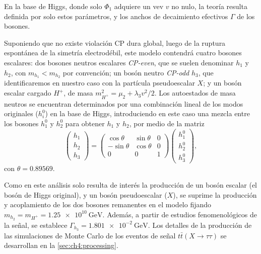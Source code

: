 En la base de Higgs, donde solo $\Phi_1$ adquiere un vev $v$ no nulo, la teoría resulta definida por solo estos parámetros, y los anchos de decaimiento efectivos $\Gamma$ de los bosones.

Suponiendo que no existe violación CP dura global, luego de la ruptura espontánea de la simetría electrodébil, este modelo contendrá cuatro bosones escalares: dos bosones neutros escalares \textit{CP-even}, que se suelen denominar $h_1$ y $h_2$, con $m_{h_1} < m_{h_2}$ por convención; un bosón neutro \textit{CP-odd} $h_3$, que identificaremos en nuestro caso con la partícula pseudoescalar $X$; y un bosón escalar cargado $H^+$, de masa $m_{H^+}^2 = \mu_2 + \lambda_3 v^2/2$. Los autoestados de masa neutros se encuentran determinados por una combinación lineal de los modos originales ($h_i^0$) en la base de Higgs, introduciendo en este caso una mezcla entre los bosones $h_1^0$ y $h_2^0$ para obtener $h_1$ y $h_2$, por medio de la matriz
\[
    \begin{pmatrix} h_1 \\ h_2 \\ h_3 \end{pmatrix}
    =
    \begin{pmatrix} \cos\theta & \sin\theta & 0 \\ -\sin\theta & \cos\theta & 0 \\ 0 & 0 & 1 \end{pmatrix}
    \begin{pmatrix} h^0_1 \\ h^0_2 \\ h^0_3 \end{pmatrix},
\]
con $\theta = 0.89569$.

Como en este análisis solo resulta de interés la producción de un bosón escalar (el bosón de Higgs original), y un bosón pseudoescalar ($X$), se suprime la producción y acoplamiento de los dos bosones remanentes en el modelo fijando $m_{h_2} = m_{H^+} = \SI{1.25e10}{\GeV}$. Además, a partir de estudios fenomenológicos de la señal, se establece $\Gamma_{h_3} = \SI{1.801e-2}{\GeV}$. Los detalles de la producción de las simulaciones de Monte Carlo de los eventos de señal $t\bar{t}(X \to \tau\tau)$ se desarrollan en la \cref{sec:ch4:processing}.

\cleardoublepage{}
